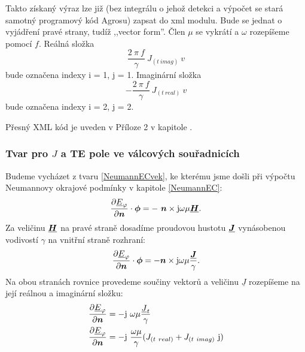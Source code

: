 \documentclass[12pt,a4paper,oneside]{article}
\numberwithin{equation}{section} %
\numberwithin{figure}{section} %
\numberwithin{table}{section} %
\newcommand{\mj}{\mathrm{j}} %
\renewcommand{\vec}[1]{\mbox{\boldmath$#1$}} %
\newcommand{\faz}[1]{{\underline{#1}}} %
\begin{document}
Takto získaný výraz lze již (bez integrálu o jehož detekci a výpočet se stará samotný programový kód Agrosu) zapsat do xml modulu. Bude se jednat o vyjádření pravé strany, tudíž ,,vector form''. Člen $\mu$ se vykrátí a $\omega$ rozepíšeme pomocí $f$. Reálná složka  
\begin{equation}
\frac{2 ~ \pi ~ f}{\gamma} ~ J_{(t~imag)} ~ v
\end{equation} 
bude označena indexy i = 1, j = 1. Imaginární složka 
\begin{equation}
- \frac{2 ~ \pi ~ f}{\gamma} ~ J_{(t~real)} ~ v
\end{equation}
bude označena indexy i = 2, j = 2.

Přesný XML kód je uveden v Příloze 2 v kapitole .


\subsubsection*{Tvar pro \faz{\vec{J}} a TE pole ve válcových souřadnicích}
Budeme vycházet z tvaru \ref{NeumannECvek}, ke kterému jsme došli při výpočtu Neumannovy okrajové podmínky v kapitole \ref{NeumannEC}:
\begin{equation}
\frac{\partial \faz{E}_{\varphi}}{\partial \vec{n}} \cdot \vec{\phi} = - ~ \vec{n} \times \mj \omega \mu \faz{\vec{H}} .
\end{equation}
Za veličinu $\faz{\vec{H}}$ na pravé straně dosadíme proudovou hustotu $\faz{\vec{J}}$ vynásobenou vodivostí $\gamma$ na vnitřní straně rozhraní:
\begin{equation}
\frac{\partial \faz{E}_{\varphi}}{\partial \vec{n}} \cdot \vec{\phi} = - \vec{n} \times \mj \omega \mu \frac{\faz{\vec{J}}}{\gamma}.
\end{equation}
Na obou stranách rovnice provedeme součiny vektorů a veličinu $\faz{J}$ rozepíšeme na její reálnou a imaginární složku:
\begin{subequations}
\begin{align}
\frac{\partial \faz{E} _{\varphi}}{\partial \vec{n}} &= - \mj ~ \omega \mu \frac{\faz{J} _t}{\gamma}
\\
\frac{\partial \faz{E} _{\varphi}}{\partial \vec{n}} &= - \mj ~ \frac{\omega \mu}{\gamma} (J _{(t~real)} + J _{(t~imag)} ~ \mj)
\end{align}
\end{subequations}
\end{document}

